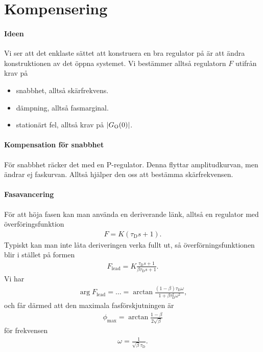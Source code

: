 \section{Kompensering}

\paragraph{Ideen}
Vi ser att det enklaste sättet att konstruera en bra regulator på är att ändra konstruktionen av det öppna systemet. Vi bestämmer alltså regulatorn $F$ utifrån krav på
\begin{itemize}
	\item snabbhet, alltså skärfrekvens.
	\item dämpning, alltså fasmarginal.
	\item stationärt fel, alltså krav på $\abs{G_{\text{O}}(0)}$.
\end{itemize}

\paragraph{Kompensation för snabbhet}
För snabbhet räcker det med en P-regulator. Denna flyttar amplitudkurvan, men ändrar ej faskurvan. Alltså hjälper den oss att bestämma skärfrekvensen.

\paragraph{Fasavancering}
För att höja fasen kan man använda en deriverande länk, alltså en regulator med överföringsfunktion
\begin{align*}
	F = K(\tau_{\text{D}}s + 1).
\end{align*}
Typiskt kan man inte låta deriveringen verka fullt ut, så överförningsfunktionen blir i stället på formen
\begin{align*}
	F_{\text{lead}} = K\frac{\tau_{\text{D}}s + 1}{\beta\tau_{\text{D}}s + 1}.
\end{align*}
Vi har
\begin{align*}
	\arg{F_{\text{lead}}} = \dots = \arctan{\frac{(1 - \beta)\tau_{\text{D}}\omega}{1 + \beta\tau_{\text{D}}^{2}\omega^{2}}},
\end{align*}
och får därmed att den maximala fasförskjutningen är
\begin{align*}
	\phi_{\text{max}} = \arctan{\frac{1 - \beta}{2\sqrt{\beta}}}
\end{align*}
för frekvensen
\begin{align*}
	\omega = \frac{1}{\sqrt{\beta}\tau_{\text{D}}}.
\end{align*}

